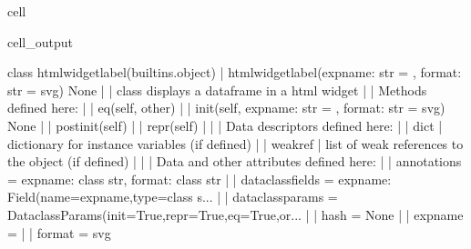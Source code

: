 \documentclass[letterpaper,10pt,english]{jupyterBook}
\begin{document}
\begin{sphinxuseclass}{cell}
\begin{sphinxVerbatimOutput}
\begin{sphinxuseclass}{cell_output}
\begin{sphinxVerbatim}[commandchars=\\\{\}]
    class htmlwidget\PYGZus{}label(builtins.object)
     |  htmlwidget\PYGZus{}label(expname: str = \PYGZsq{}\PYGZsq{}, format: str = \PYGZsq{}svg\PYGZsq{}) \PYGZhy{}\PYGZgt{} None
     |  
     |  class displays a dataframe in a html widget
     |  
     |  Methods defined here:
     |  
     |  \PYGZus{}\PYGZus{}eq\PYGZus{}\PYGZus{}(self, other)
     |  
     |  \PYGZus{}\PYGZus{}init\PYGZus{}\PYGZus{}(self, expname: str = \PYGZsq{}\PYGZsq{}, format: str = \PYGZsq{}svg\PYGZsq{}) \PYGZhy{}\PYGZgt{} None
     |  
     |  \PYGZus{}\PYGZus{}post\PYGZus{}init\PYGZus{}\PYGZus{}(self)
     |  
     |  \PYGZus{}\PYGZus{}repr\PYGZus{}\PYGZus{}(self)
     |  
     |  \PYGZhy{}\PYGZhy{}\PYGZhy{}\PYGZhy{}\PYGZhy{}\PYGZhy{}\PYGZhy{}\PYGZhy{}\PYGZhy{}\PYGZhy{}\PYGZhy{}\PYGZhy{}\PYGZhy{}\PYGZhy{}\PYGZhy{}\PYGZhy{}\PYGZhy{}\PYGZhy{}\PYGZhy{}\PYGZhy{}\PYGZhy{}\PYGZhy{}\PYGZhy{}\PYGZhy{}\PYGZhy{}\PYGZhy{}\PYGZhy{}\PYGZhy{}\PYGZhy{}\PYGZhy{}\PYGZhy{}\PYGZhy{}\PYGZhy{}\PYGZhy{}\PYGZhy{}\PYGZhy{}\PYGZhy{}\PYGZhy{}\PYGZhy{}\PYGZhy{}\PYGZhy{}\PYGZhy{}\PYGZhy{}\PYGZhy{}\PYGZhy{}\PYGZhy{}\PYGZhy{}\PYGZhy{}\PYGZhy{}\PYGZhy{}\PYGZhy{}\PYGZhy{}\PYGZhy{}\PYGZhy{}\PYGZhy{}\PYGZhy{}\PYGZhy{}\PYGZhy{}\PYGZhy{}\PYGZhy{}\PYGZhy{}\PYGZhy{}\PYGZhy{}\PYGZhy{}\PYGZhy{}\PYGZhy{}\PYGZhy{}\PYGZhy{}\PYGZhy{}\PYGZhy{}
     |  Data descriptors defined here:
     |  
     |  \PYGZus{}\PYGZus{}dict\PYGZus{}\PYGZus{}
     |      dictionary for instance variables (if defined)
     |  
     |  \PYGZus{}\PYGZus{}weakref\PYGZus{}\PYGZus{}
     |      list of weak references to the object (if defined)
     |  
     |  \PYGZhy{}\PYGZhy{}\PYGZhy{}\PYGZhy{}\PYGZhy{}\PYGZhy{}\PYGZhy{}\PYGZhy{}\PYGZhy{}\PYGZhy{}\PYGZhy{}\PYGZhy{}\PYGZhy{}\PYGZhy{}\PYGZhy{}\PYGZhy{}\PYGZhy{}\PYGZhy{}\PYGZhy{}\PYGZhy{}\PYGZhy{}\PYGZhy{}\PYGZhy{}\PYGZhy{}\PYGZhy{}\PYGZhy{}\PYGZhy{}\PYGZhy{}\PYGZhy{}\PYGZhy{}\PYGZhy{}\PYGZhy{}\PYGZhy{}\PYGZhy{}\PYGZhy{}\PYGZhy{}\PYGZhy{}\PYGZhy{}\PYGZhy{}\PYGZhy{}\PYGZhy{}\PYGZhy{}\PYGZhy{}\PYGZhy{}\PYGZhy{}\PYGZhy{}\PYGZhy{}\PYGZhy{}\PYGZhy{}\PYGZhy{}\PYGZhy{}\PYGZhy{}\PYGZhy{}\PYGZhy{}\PYGZhy{}\PYGZhy{}\PYGZhy{}\PYGZhy{}\PYGZhy{}\PYGZhy{}\PYGZhy{}\PYGZhy{}\PYGZhy{}\PYGZhy{}\PYGZhy{}\PYGZhy{}\PYGZhy{}\PYGZhy{}\PYGZhy{}\PYGZhy{}
     |  Data and other attributes defined here:
     |  
     |  \PYGZus{}\PYGZus{}annotations\PYGZus{}\PYGZus{} = \PYGZob{}\PYGZsq{}expname\PYGZsq{}: \PYGZlt{}class \PYGZsq{}str\PYGZsq{}\PYGZgt{}, \PYGZsq{}format\PYGZsq{}: \PYGZlt{}class \PYGZsq{}str\PYGZsq{}\PYGZgt{}\PYGZcb{}
     |  
     |  \PYGZus{}\PYGZus{}dataclass\PYGZus{}fields\PYGZus{}\PYGZus{} = \PYGZob{}\PYGZsq{}expname\PYGZsq{}: Field(name=\PYGZsq{}expname\PYGZsq{},type=\PYGZlt{}class \PYGZsq{}s...
     |  
     |  \PYGZus{}\PYGZus{}dataclass\PYGZus{}params\PYGZus{}\PYGZus{} = \PYGZus{}DataclassParams(init=True,repr=True,eq=True,or...
     |  
     |  \PYGZus{}\PYGZus{}hash\PYGZus{}\PYGZus{} = None
     |  
     |  expname = \PYGZsq{}\PYGZsq{}
     |  
     |  format = \PYGZsq{}svg\PYGZsq{}
    

\end{sphinxVerbatim}
\end{sphinxuseclass}
\end{sphinxVerbatimOutput}
\end{sphinxuseclass}
\end{document}
